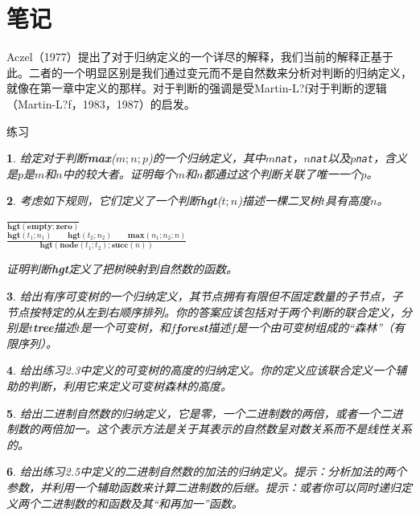 \section{笔记}
Aczel（1977）提出了对于归纳定义的一个详尽的解释，我们当前的解释正基于此。二者的一个明显区别是我们通过变元而不是自然数来分析对判断的归纳定义，就像在第一章中定义的那样。对于判断的强调是受Martin-L?f对于判断的逻辑（Martin-L?f，1983，1987）的启发。

\Large{练习}
\newtheorem{excs}{}[chapter]
\begin{excs}
给定对于判断\textbf{max}($m;n;p$)的一个归纳定义，其中$m$\texttt{nat}，$n$\texttt{nat}以及$p$\texttt{nat}，含义是$p$是$m$和$n$中的较大者。证明每个$m$和$n$都通过这个判断关联了唯一一个$p$。
\end{excs}
\begin{excs}
考虑如下规则，它们定义了一个判断\textbf{hgt}($t;n$)描述一棵二叉树$t$具有\textit{高度}$n$。
\begin{center}
$\frac{}{\textbf{hgt}(\textbf{empty};\textbf{zero})}$ \\
$\frac{\textbf{hgt}(t_{1};n_{1})\qquad\textbf{hgt}(t_{2};n_{2})\qquad\textbf{max}(n_{1};n_{2};n)}{\textbf{hgt}(\textbf{node}(t_{1};t_{2});\textbf{succ}(n))}$
\end{center}
证明判断\textbf{hgt}定义了把树映射到自然数的函数。
\end{excs}
\begin{excs}
给出\textit{有序可变树}的一个归纳定义，其节点拥有有限但不固定数量的子节点，子节点按特定的从左到右顺序排列。你的答案应该包括对于两个判断的联合定义，分别是$t$\textbf{tree}描述$t$是一个可变树，和$f$\textbf{forest}描述$f$是一个由可变树组成的“森林”（有限序列）。
\end{excs}
\begin{excs}
给出练习2.3中定义的可变树的高度的归纳定义。你的定义应该联合定义一个辅助的判断，利用它来定义可变树森林的高度。
\end{excs}
\begin{excs}
给出\textit{二进制自然数}的归纳定义，它是零，一个二进制数的两倍，或者一个二进制数的两倍加一。这个表示方法是关于其表示的自然数呈对数关系而不是线性关系的。
\end{excs}
\begin{excs}
给出练习2.5中定义的二进制自然数的加法的归纳定义。\textit{提示}：分析加法的两个参数，并利用一个辅助函数来计算二进制数的后继。\textit{提示}：或者你可以同时递归定义两个二进制数的和函数及其“和再加一”函数。
\end{excs}